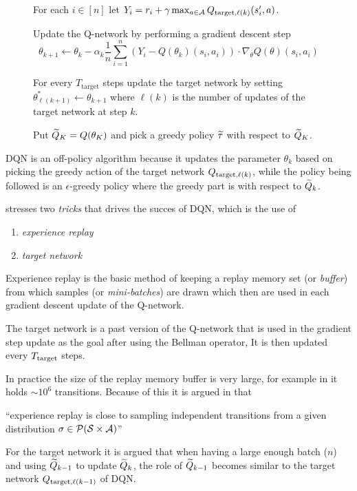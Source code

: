 \begin{figure}[H]
\begin{algorithm}[H]
{    For each $i \in [n]$ let $Y_i = r_i + \gamma \max_{a \in \mathcal{A}}
    Q_{\mathrm{target}, \ell(k)}(s_i', a)$.

    Update the Q-network by performing a gradient descent step
    \[ \theta_{k+1} \leftarrow \theta_k - \alpha_k \frac{1}{n} \sum_{i = 1}^n
	(Y_i - Q(\theta_k)(s_i, a_i)) \cdot \nabla_{\theta}
    Q(\theta)(s_i, a_i) \]

    For every $T_{\mathrm{target}}$ steps update the target network by
    setting $\theta^*_{\ell(k+1)} \leftarrow \theta_{k+1}$
    where $\ell(k)$ is the number of updates of the target network
    at step $k$.
  }
  Put $\widetilde{Q}_K = Q(\theta_K)$ and pick a greedy policy $\widetilde{\tau}$
  with respect to $\widetilde{Q}_K$.

  \label{alg:DQN}
\end{algorithm}
\end{figure}

DQN is an off-policy algorithm because it updates the
parameter $\theta_k$ based on picking the greedy action of the
target network $Q_{\mathrm{target}, \ell(k)}$, while the policy being
followed is an $\epsilon$-greedy policy where the greedy part is
with respect to $\widetilde{Q}_k$.

 stresses two \emph{tricks} that drives the succes of DQN,
which is the use of
\begin{enumerate}
  \item \emph{experience replay}
  \item \emph{target network}
\end{enumerate}
Experience replay is the basic method of keeping a replay memory
set (or \emph{buffer}) from which samples (or \emph{mini-batches}) are
drawn which then are used in each gradient descent update of the
Q-network.

The target network is a past version of the Q-network that is used
in the gradient step update as the goal after using the Bellman operator,
It is then updated every $T_{\mathrm{target}}$ steps.

In practice the size of the replay memory buffer is very large, for example
in  it holds $\sim 10^6$ transitions.
Because of this it is argued in  that
\begin{displayquote}
``experience replay is close to sampling independent transitions
from a given distribution $\sigma \in \mathcal{P}(\mathcal{S} \times \mathcal{A})$''
\end{displayquote}
For the target network it is argued that when having a large enough batch
($n$) and using $\widetilde{Q}_{k-1}$ to update $\widetilde{Q}_k$, the role of
$\widetilde{Q}_{k-1}$ becomes similar to the target network
$Q_{\mathrm{target}, \ell(k-1)}$ of DQN.


